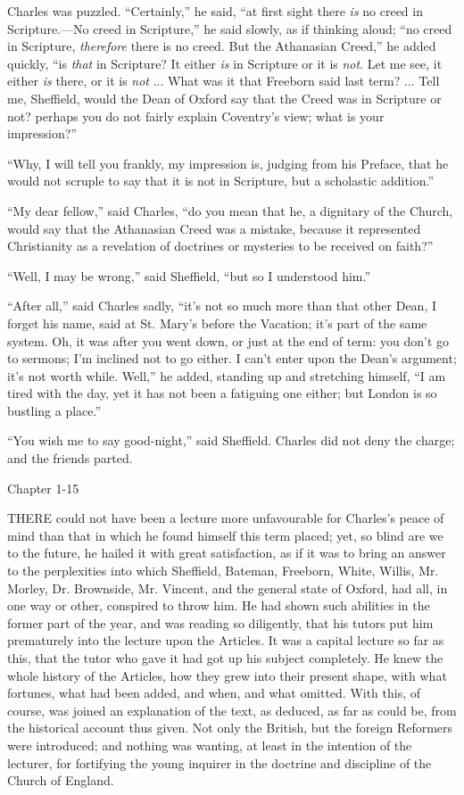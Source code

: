 Charles was puzzled. ``Certainly,'' he said, ``at first
sight there \emph{is} no creed in Scripture.—No creed in
Scripture,'' he said slowly, as if thinking aloud; ``no creed
in Scripture, \emph{therefore} there is no creed. But the Athanasian
Creed,'' he added quickly, ``is \emph{that} in Scripture? It
either \emph{is} in Scripture or it is \emph{not}. Let me see, it either \emph{is}
there, or it is \emph{not} ... What was it that Freeborn said last
term? ... Tell me, Sheffield, would the Dean of Oxford say that the
Creed was in Scripture or not? perhaps you do not fairly explain
Coventry's view; what is your impression?''

``Why, I will tell you frankly, my impression is, judging from
his Preface, that he would not scruple to say that it is not in
Scripture, but a scholastic addition.''

``My dear fellow,'' said Charles, ``do you mean that
he, a dignitary of the Church, would say that the Athanasian Creed was
a mistake, because it represented Christianity as a revelation of
doctrines or mysteries to be received on faith?''

``Well, I may be wrong,'' said Sheffield, ``but so I
understood him.''

``After all,'' said Charles sadly, ``it's not so much
more than that other Dean, I forget his name, said at St. Mary's
before the Vacation; it's part of the same system. Oh, it was after
you went down, or just at the end of term: you don't go to sermons; I'm
inclined not to go either. I can't enter upon the Dean's argument; it's
not worth while. Well,'' he added, standing up and stretching
himself, ``I am tired with the day, yet it has not been a
fatiguing one either; but London is so bustling a place.''

``You wish me to say good-night,'' said Sheffield. Charles
did not deny the charge; and the friends parted.

Chapter 1-15


THERE could not have been a lecture
more unfavourable for Charles's peace of mind than that in which he
found himself this term placed; yet, so blind are we to the future, he
hailed it with great satisfaction, as if it was to bring an answer to
the perplexities into which Sheffield, Bateman, Freeborn, White,
Willis, Mr. Morley, Dr. Brownside, Mr. Vincent, and the general state
of Oxford, had all, in one way or other, conspired to throw him. He
had shown such abilities in the former part of the year, and was
reading so diligently, that his tutors put him prematurely into the
lecture upon the Articles. It was a capital lecture so far as this,
that the tutor who gave it had got up his subject completely. He knew
the whole history of the Articles, how they grew into their present
shape, with what fortunes, what had been added, and when, and what
omitted. With this, of course, was joined an explanation of the text,
as deduced, as far as could be, from the historical account thus
given. Not only the British, but the foreign Reformers were
introduced; and nothing was wanting, at least in the intention of the
lecturer, for fortifying the young inquirer in the doctrine and
discipline of the Church of England.

